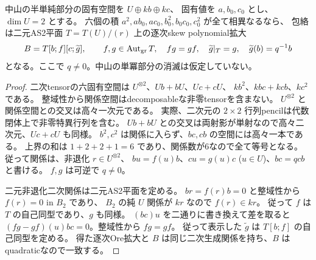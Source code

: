\begin{theorem}
\label{thm:cubic-211-nonresonant-Ore}
中山の半単純部分の固有空間を $U\oplus kb\oplus kc$、
固有値を $a,b_0,c_0$ とし、$\dim U=2$ とする。
六個の積 $a^2,ab_0,ac_0,b_0^2,b_0c_0,c_0^2$ が全て相異なるなら、
包絡は二元AS2平面 $T=T(U)/(r)$ 上の逐次skew polynomial拡大
\[
 B=T[b;f][c;\widetilde g],\qquad
 f,g\in\operatorname{Aut}_{\rm gr}T,\quad fg=gf,\quad
 \widetilde g|_T=g,\quad\widetilde g(b)=q^{-1}b
\]
となる。ここで $q\ne0$。中山の単冪部分の消滅は仮定していない。
\end{theorem}
\begin{proof}
二次tensorの六固有空間は $U^{\otimes2}$、$Ub+bU$、$Uc+cU$、
$kb^2$、$kbc+kcb$、$kc^2$ である。
整域性から関係空間はdecomposableな非零tensorを含まない。
$U^{\otimes2}$ と関係空間との交叉は高々一次元である。
実際、二次元の $2\times2$ 行列pencilは代数閉体上で非零特異行列を含む。
$Ub+bU$ との交叉は両射影が単射なので高々二次元、$Uc+cU$ も同様。
$b^2,c^2$ は関係に入らず、$bc,cb$ の空間には高々一本である。
上界の和は $1+2+2+1=6$ であり、関係数が6なので全て等号となる。
従って関係は、非退化 $r\in U^{\otimes2}$、
$b u=f(u)b$、$c u=g(u)c$ ($u\in U$)、$bc=qcb$ と書ける。
$f,g$ は可逆で $q\ne0$。

二元非退化二次関係は二元AS2平面を定める。
$br=f(r)b=0$ と整域性から $f(r)=0$ in $B_2$ であり、
$B_2$ の純 $U$ 関係が $kr$ なので $f(r)\in kr$。
従って $f$ は $T$ の自己同型であり、$g$ も同様。
$(bc)u$ を二通りに書き換えて差を取ると
$(fg-gf)(u)bc=0$。整域性から $fg=gf$。
従って表示した $\widetilde g$ は $T[b;f]$ の自己同型を定める。
得た逐次Ore拡大と $B$ は同じ二次生成関係を持ち、$B$ はquadraticなので一致する。
\end{proof}

